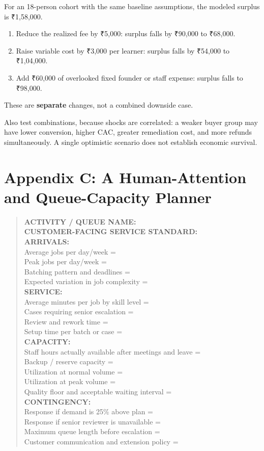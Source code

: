 For an 18-person cohort with the same baseline assumptions, the modeled surplus is ₹1,58,000.
\begin{enumerate}
\item Reduce the realized fee by ₹5,000: surplus falls by ₹90,000 to ₹68,000.
\item Raise variable cost by ₹3,000 per learner: surplus falls by ₹54,000 to ₹1,04,000.
\item Add ₹60,000 of overlooked fixed founder or staff expense: surplus falls to ₹98,000.
\end{enumerate}
These are \textbf{separate} changes, not a combined downside case.

Also test combinations, because shocks are correlated: a weaker buyer group may have lower conversion, higher CAC, greater remediation cost, and more refunds simultaneously. A single optimistic scenario does not establish economic survival.

\section*{Appendix C: A Human-Attention and Queue-Capacity Planner}

\begin{quote}
\small
\textbf{ACTIVITY / QUEUE NAME:}\\
\textbf{CUSTOMER-FACING SERVICE STANDARD:}\\[1ex]
\textbf{ARRIVALS:}\\
Average jobs per day/week =\\
Peak jobs per day/week =\\
Batching pattern and deadlines =\\
Expected variation in job complexity =\\[1ex]
\textbf{SERVICE:}\\
Average minutes per job by skill level =\\
Cases requiring senior escalation =\\
Review and rework time =\\
Setup time per batch or case =\\[1ex]
\textbf{CAPACITY:}\\
Staff hours actually available after meetings and leave =\\
Backup / reserve capacity =\\
Utilization at normal volume =\\
Utilization at peak volume =\\
Quality floor and acceptable waiting interval =\\[1ex]
\textbf{CONTINGENCY:}\\
Response if demand is 25\% above plan =\\
Response if senior reviewer is unavailable =\\
Maximum queue length before escalation =\\
Customer communication and extension policy =
\end{quote}


